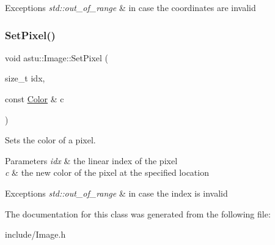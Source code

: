 \begin{DoxyExceptions}{Exceptions}
{\em std\+::out\+\_\+of\+\_\+range} & in case the coordinates are invalid \\
\hline
\end{DoxyExceptions}
\mbox{\label{classastu_1_1Image_a1c2f1673fbba03abc50101c2d75ef12e}} 
\subsubsection{\texorpdfstring{Set\+Pixel()}{SetPixel()}\hspace{0.1cm}{\footnotesize\ttfamily [2/2]}}
{\footnotesize\ttfamily void astu\+::\+Image\+::\+Set\+Pixel (\begin{DoxyParamCaption}\item[{size\+\_\+t}]{idx,  }\item[{const \hyperlink{classastu_1_1Color}{Color} \&}]{c }\end{DoxyParamCaption})}

Sets the color of a pixel.


\begin{DoxyParams}{Parameters}
{\em idx} & the linear index of the pixel \\
\hline
{\em c} & the new color of the pixel at the specified location \\
\hline
\end{DoxyParams}

\begin{DoxyExceptions}{Exceptions}
{\em std\+::out\+\_\+of\+\_\+range} & in case the index is invalid \\
\hline
\end{DoxyExceptions}


The documentation for this class was generated from the following file\+:\begin{DoxyCompactItemize}
\item 
include/Image.\+h\end{DoxyCompactItemize}
